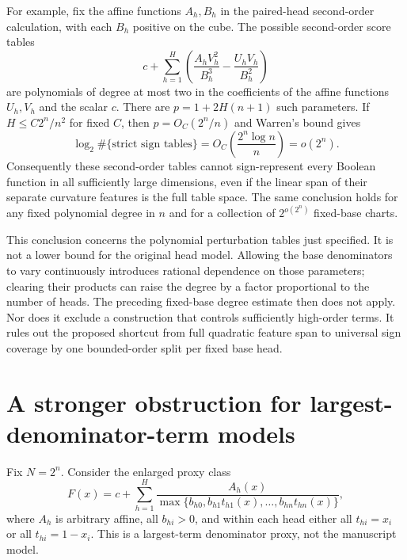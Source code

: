 \documentclass[11pt]{article}
\begin{document}
For example, fix the affine functions $A_h,B_h$ in the paired-head
second-order calculation, with each $B_h$ positive on the cube.
The possible second-order score tables
\[
 c+\sum_{h=1}^H\left(
 \frac{A_hV_h^2}{B_h^3}-\frac{U_hV_h}{B_h^2}\right)
\]
are polynomials of degree at most two in the coefficients of the
affine functions $U_h,V_h$ and the scalar $c$. There are
$p=1+2H(n+1)$ such parameters. If $H\le C2^n/n^2$ for fixed
$C$, then $p=O_C(2^n/n)$ and Warren's bound gives
\[
 \log_2\#\{\text{strict sign tables}\}
 =O_C\left(\frac{2^n\log n}{n}\right)=o(2^n).
\]
Consequently these second-order tables cannot sign-represent every
Boolean function in all sufficiently large dimensions, even if the
linear span of their separate curvature features is the full table
space. The same conclusion holds for any fixed polynomial degree
in $n$ and for a collection of $2^{o(2^n)}$ fixed-base charts.

This conclusion concerns the polynomial perturbation tables just
specified. It is not a lower bound for the original head model.
Allowing the base denominators to vary continuously introduces
rational dependence on those parameters; clearing their products
can raise the degree by a factor proportional to the number of
heads. The preceding fixed-base degree estimate then does not
apply. Nor does it exclude a construction that controls sufficiently
high-order terms. It rules out the proposed shortcut from full
quadratic feature span to universal sign coverage by one bounded-order
split per fixed base head.

\section{A stronger obstruction for largest-denominator-term models}

Fix $N=2^n$. Consider the enlarged proxy class
\[
 F(x)=c+\sum_{h=1}^H
 \frac{A_h(x)}{\max\{b_{h0},b_{h1}t_{h1}(x),\ldots,
                         b_{hn}t_{hn}(x)\}},
\]
where $A_h$ is arbitrary affine, all $b_{hi}>0$, and within each
head either all $t_{hi}=x_i$ or all $t_{hi}=1-x_i$.
This is a largest-term denominator proxy, not the manuscript model.
\end{document}

